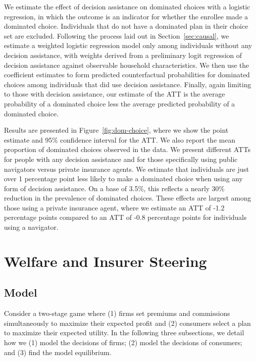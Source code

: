 \documentclass[12pt]{article}
\begin{document}
We estimate the effect of decision assistance on dominated choices with a logistic regression, in which the outcome is an indicator for whether the enrollee made a dominated choice. Individuals that do not have a dominated plan in their choice set are excluded. Following the process laid out in Section~\ref{sec:causal}, we estimate a weighted logistic regression model only among individuals without any decision assistance, with weights derived from a preliminary logit regression of decision assistance against observable household characteristics. We then use the coefficient estimates to form predicted counterfactual probabilities for dominated choices among individuals that did use decision assistance. Finally, again limiting to those with decision assistance, our estimate of the ATT is the average probability of a dominated choice less the average predicted probability of a dominated choice.

Results are presented in Figure~\ref{fig:dom-choice}, where we show the point estimate and 95\% confidence interval for the ATT. We also report the mean proportion of dominated choices observed in the data. We present different ATTs for people with any decision assistance and for those specifically using public navigators versus private insurance agents. We estimate that individuals are just over 1 percentage point less likely to make a dominated choice when using any form of decision assistance. On a base of 3.5\%, this reflects a nearly 30\% reduction in the prevalence of dominated choices. These effects are largest among those using a private insurance agent, where we estimate an ATT of -1.2 percentage points compared to an ATT of -0.8 percentage points for individuals using a navigator.


\section{Welfare and Insurer Steering}
\label{sec:steering}

\subsection{Model}
\label{subsec:steering-model}

Consider a two-stage  game where  (1) firms set premiums and commissions simultaneously to maximize their expected profit and (2) consumers select a plan to maximize their expected utility. In the following three subsections, we detail how we (1) model the decisions of firms; (2) model the decisions of consumers; and (3) find the model equilibrium.  
\end{document}
